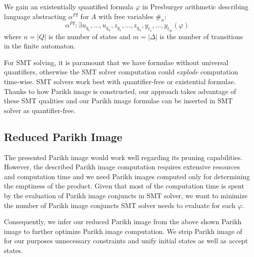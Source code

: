 We gain an existentially quantified formula $\varphi$ in Presburger arithmetic describing language abstracting $\alpha^{PI}$ for $A$ with free variables $\#_a$:
$$ \alpha^{PI} : \exists u_{q_1},\ldots,u_{q_n},z_{q_1},\ldots,z_{q_n},y_{t_1},\ldots,y_{t_m} ( \varphi ) $$
where $n = \lvert Q \rvert$ is the number of states and $m = \lvert \Delta \rvert$ is the number of transitions in the finite automaton.

For SMT solving, it is paramount that we have formulae without universal quantifiers, otherwise the SMT solver computation could \emph{explode} computation time-wise. SMT solvers work best with quantifier-free or existential formulae. Thanks to how Parikh image is constructed, our approach takes advantage of these SMT qualities and our Parikh image formulae can be inserted in SMT solver as quantifier-free.

\subsection{Reduced Parikh Image}\label{sec:reducedParikhImage}

The presented Parikh image would work well regarding its pruning capabilities. However, the described Parikh image computation requires extensive resources and computation time and we need Parikh images computed only for determining the emptiness of the product. Given that most of the computation time is spent by the evaluation of Parikh image conjuncts in SMT solver, we want to minimize the number of Parikh image conjuncts SMT solver needs to evaluate for each $\varphi$.

Consequently, we infer our reduced Parikh image from the above shown Parikh image to further optimize Parikh image computation. We strip Parikh image of for our purposes unnecessary constraints and unify initial states as well as accept states.


